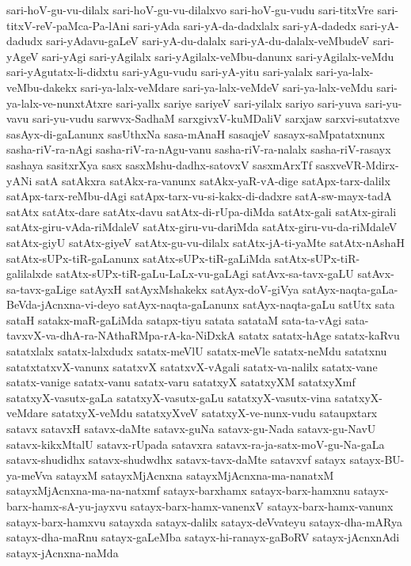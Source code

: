{sari-hoV-gu-vu-dilalx
sari-hoV-gu-vu-dilalxvo
sari-hoV-gu-vudu
sari-titxVre
sari-titxV-reV-paMca-Pa-lAni
sari-yAda
sari-yA-da-dadxlalx
sari-yA-dadedx
sari-yA-dadudx
sari-yAdavu-gaLeV
sari-yA-du-dalalx
sari-yA-du-dalalx-veMbudeV
sari-yAgeV
sari-yAgi
sari-yAgilalx
sari-yAgilalx-veMbu-danunx
sari-yAgilalx-veMdu
sari-yAgutatx-li-didxtu
sari-yAgu-vudu
sari-yA-yitu
sari-yalalx
sari-ya-lalx-veMbu-dakekx
sari-ya-lalx-veMdare
sari-ya-lalx-veMdeV
sari-ya-lalx-veMdu
sari-ya-lalx-ve-nunxtAtxre
sari-yallx
sariye
sariyeV
sari-yilalx
sariyo
sari-yuva
sari-yu-vavu
sari-yu-vudu
sarwvx-SadhaM
sarxgivxV-kuMDaliV
sarxjaw
sarxvi-sutatxve
sasAyx-di-gaLanunx
sasUthxNa
sasa-mAnaH
sasaqjeV
sasayx-saMpatatxnunx
sasha-riV-ra-nAgi
sasha-riV-ra-nAgu-vanu
sasha-riV-ra-nalalx
sasha-riV-rasayx
sashaya
sasitxrXya
sasx
sasxMshu-dadhx-satovxV
sasxmArxTf
sasxveVR-Mdirx-yANi
satA
satAkxra
satAkx-ra-vanunx
satAkx-yaR-vA-dige
satApx-tarx-dalilx
satApx-tarx-reMbu-dAgi
satApx-tarx-vu-si-kakx-di-dadxre
satA-sw-mayx-tadA
satAtx
satAtx-dare
satAtx-davu
satAtx-di-rUpa-diMda
satAtx-gali
satAtx-girali
satAtx-giru-vAda-riMdaleV
satAtx-giru-vu-dariMda
satAtx-giru-vu-da-riMdaleV
satAtx-giyU
satAtx-giyeV
satAtx-gu-vu-dilalx
satAtx-jA-ti-yaMte
satAtx-nAshaH
satAtx-sUPx-tiR-gaLanunx
satAtx-sUPx-tiR-gaLiMda
satAtx-sUPx-tiR-galilalxde
satAtx-sUPx-tiR-gaLu-LaLx-vu-gaLAgi
satAvx-sa-tavx-gaLU
satAvx-sa-tavx-gaLige
satAyxH
satAyxMshakekx
satAyx-doV-giVya
satAyx-naqta-gaLa-BeVda-jAcnxna-vi-deyo
satAyx-naqta-gaLanunx
satAyx-naqta-gaLu
satUtx
sata
sataH
satakx-maR-gaLiMda
satapx-tiyu
satata
satataM
sata-ta-vAgi
sata-tavxvX-va-dhA-ra-NAthaRMpa-rA-ka-NiDxkA
satatx
satatx-hAge
satatx-kaRvu
satatxlalx
satatx-lalxdudx
satatx-meVlU
satatx-meVle
satatx-neMdu
satatxnu
satatxtatxvX-vanunx
satatxvX
satatxvX-vAgali
satatx-va-nalilx
satatx-vane
satatx-vanige
satatx-vanu
satatx-varu
satatxyX
satatxyXM
satatxyXmf
satatxyX-vasutx-gaLa
satatxyX-vasutx-gaLu
satatxyX-vasutx-vina
satatxyX-veMdare
satatxyX-veMdu
satatxyXveV
satatxyX-ve-nunx-vudu
sataupxtarx
satavx
satavxH
satavx-daMte
satavx-guNa
satavx-gu-Nada
satavx-gu-NavU
satavx-kikxMtalU
satavx-rUpada
satavxra
satavx-ra-ja-satx-moV-gu-Na-gaLa
satavx-shudidhx
satavx-shudwdhx
satavx-tavx-daMte
satavxvf
satayx
satayx-BU-ya-meVva
satayxM
satayxMjAcnxna
satayxMjAcnxna-ma-nanatxM
satayxMjAcnxna-ma-na-natxmf
satayx-barxhamx
satayx-barx-hamxnu
satayx-barx-hamx-sA-yu-jayxvu
satayx-barx-hamx-vanenxV
satayx-barx-hamx-vanunx
satayx-barx-hamxvu
satayxda
satayx-dalilx
satayx-deVvateyu
satayx-dha-mARya
satayx-dha-maRnu
satayx-gaLeMba
satayx-hi-ranayx-gaBoRV
satayx-jAcnxnAdi
satayx-jAcnxna-naMda
}
